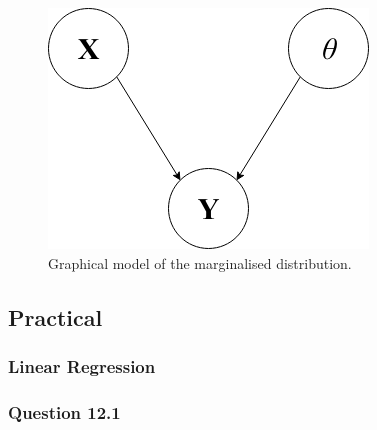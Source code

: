 \documentclass[10pt, a4paper, twocolumn]{article} %
\begin{document}
\begin{figure}[htbp]
\centerline{\includegraphics[width=0.5\linewidth]{question_11.png}}
\caption{Graphical model of the marginalised distribution.}
\label{fig2}
\end{figure}

\subsection{Practical}
\subsubsection{Linear Regression}
\subsubsection*{Question 12.1}
\end{document}
